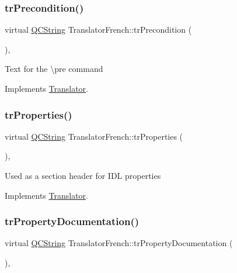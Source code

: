\subsubsection{\texorpdfstring{trPrecondition()}{trPrecondition()}}
{\footnotesize\ttfamily virtual \mbox{\hyperlink{class_q_c_string}{Q\+C\+String}} Translator\+French\+::tr\+Precondition (\begin{DoxyParamCaption}{ }\end{DoxyParamCaption})\hspace{0.3cm}{\ttfamily [inline]}, {\ttfamily [virtual]}}

Text for the \textbackslash{}pre command 

Implements \mbox{\hyperlink{class_translator}{Translator}}.

\mbox{\label{class_translator_french_a468a4bc842b33460a853150bf0eb6b2d}} 
\subsubsection{\texorpdfstring{trProperties()}{trProperties()}}
{\footnotesize\ttfamily virtual \mbox{\hyperlink{class_q_c_string}{Q\+C\+String}} Translator\+French\+::tr\+Properties (\begin{DoxyParamCaption}{ }\end{DoxyParamCaption})\hspace{0.3cm}{\ttfamily [inline]}, {\ttfamily [virtual]}}

Used as a section header for I\+DL properties 

Implements \mbox{\hyperlink{class_translator}{Translator}}.

\mbox{\label{class_translator_french_adee97f184381667715ac695dfdb66990}} 
\subsubsection{\texorpdfstring{trPropertyDocumentation()}{trPropertyDocumentation()}}
{\footnotesize\ttfamily virtual \mbox{\hyperlink{class_q_c_string}{Q\+C\+String}} Translator\+French\+::tr\+Property\+Documentation (\begin{DoxyParamCaption}{ }\end{DoxyParamCaption})\hspace{0.3cm}{\ttfamily [inline]}, {\ttfamily [virtual]}}

